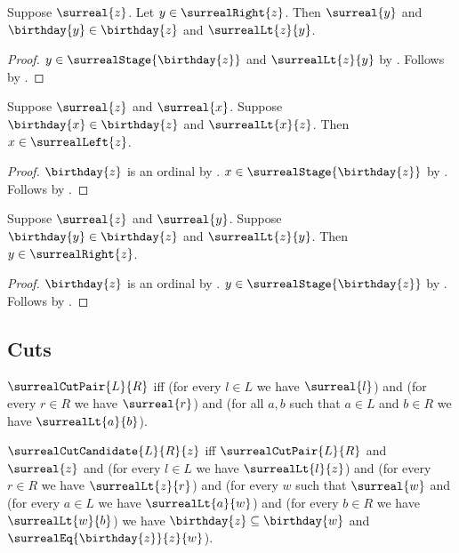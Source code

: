 \begin{proposition}\label{surreal_right_elim}
    Suppose $\surreal{z}$.
    Let $y\in\surrealRight{z}$.
    Then $\surreal{y}$ and $\birthday{y}\in\birthday{z}$ and
        $\surrealLt{z}{y}$.
\end{proposition}
\begin{proof}
    $y\in\surrealStage{\birthday{z}}$ and $\surrealLt{z}{y}$
        by .
    Follows by
        .
\end{proof}

\begin{proposition}\label{surreal_left_intro}
    Suppose $\surreal{z}$ and $\surreal{x}$.
    Suppose $\birthday{x}\in\birthday{z}$ and $\surrealLt{x}{z}$.
    Then $x\in\surrealLeft{z}$.
\end{proposition}
\begin{proof}
    $\birthday{z}$ is an ordinal
        by .
    $x\in\surrealStage{\birthday{z}}$
        by .
    Follows by .
\end{proof}

\begin{proposition}\label{surreal_right_intro}
    Suppose $\surreal{z}$ and $\surreal{y}$.
    Suppose $\birthday{y}\in\birthday{z}$ and $\surrealLt{z}{y}$.
    Then $y\in\surrealRight{z}$.
\end{proposition}
\begin{proof}
    $\birthday{z}$ is an ordinal
        by .
    $y\in\surrealStage{\birthday{z}}$
        by .
    Follows by .
\end{proof}

\subsection{Cuts}

\begin{definition}\label{surreal_cut_pair}
    $\surrealCutPair{L}{R}$ iff
        (for every $l\in L$ we have $\surreal{l}$) and
        (for every $r\in R$ we have $\surreal{r}$) and
        (for all $a,b$ such that $a\in L$ and $b\in R$ we have
            $\surrealLt{a}{b}$).
\end{definition}

\begin{definition}\label{surreal_cut_candidate}
    $\surrealCutCandidate{L}{R}{z}$ iff
        $\surrealCutPair{L}{R}$ and $\surreal{z}$ and
        (for every $l\in L$ we have $\surrealLt{l}{z}$) and
        (for every $r\in R$ we have $\surrealLt{z}{r}$) and
        (for every $w$ such that $\surreal{w}$ and
            (for every $a\in L$ we have $\surrealLt{a}{w}$) and
            (for every $b\in R$ we have $\surrealLt{w}{b}$)
        we have $\birthday{z}\subseteq\birthday{w}$ and
            $\surrealEq{\birthday{z}}{z}{w}$).
\end{definition}

